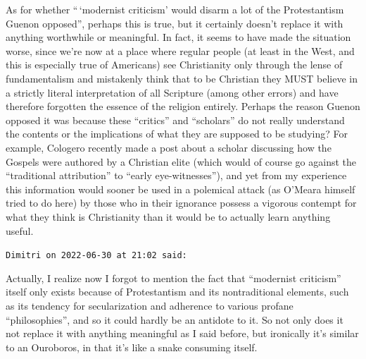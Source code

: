 \begin{footnotesize}
\begin{sffamily}
As for whether ``\,`modernist criticism' would disarm a lot of the Protestantism Guenon opposed'', perhaps this is true, but it certainly doesn't replace it with anything worthwhile or meaningful. In fact, it seems to have made the situation worse, since we're now at a place where regular people (at least in the West, and this is especially true of Americans) see Christianity only through the lense of fundamentalism and mistakenly think that to be Christian they MUST believe in a strictly literal interpretation of all Scripture (among other errors) and have therefore forgotten the essence of the religion entirely. Perhaps the reason Guenon opposed it was because these ``critics'' and ``scholars'' do not really understand the contents or the implications of what they are supposed to be studying? For example, Cologero recently made a post about a scholar discussing how the Gospels were authored by a Christian elite (which would of course go against the ``traditional attribution'' to ``early eye-witnesses''), and yet from my experience this information would sooner be used in a polemical attack (as O'Meara himself tried to do here) by those who in their ignorance possess a vigorous contempt for what they think is Christianity than it would be to actually learn anything useful.

\hfill

\texttt{Dimitri on 2022-06-30 at 21:02 said:}

Actually, I realize now I forgot to mention the fact that ``modernist criticism'' itself only exists because of Protestantism and its nontraditional elements, such as its tendency for secularization and adherence to various profane ``philosophies'', and so it could hardly be an antidote to it. So not only does it not replace it with anything meaningful as I said before, but ironically it's similar to an Ouroboros, in that it's like a snake consuming itself.

\end{sffamily}
\end{footnotesize}

